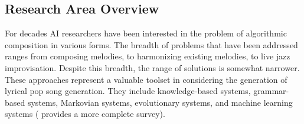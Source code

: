 \documentclass[11pt,phd]{byuprop}
\begin{document}
\subsection{Research Area Overview}
%
%
%
%
%
%
%
%
%
%
%


For decades AI researchers have been interested in the problem of algorithmic composition in various forms. The breadth of problems that have been addressed ranges from composing melodies, to harmonizing existing melodies, to live jazz improvisation. Despite this breadth, the range of solutions is somewhat narrower. These approaches represent a valuable toolset in considering the generation of lyrical pop song generation. They include knowledge-based systems, grammar-based systems, Markovian systems, evolutionary systems, and machine learning systems (\cite{papadopoulos1999ai} provides a more complete survey).
\end{document}
